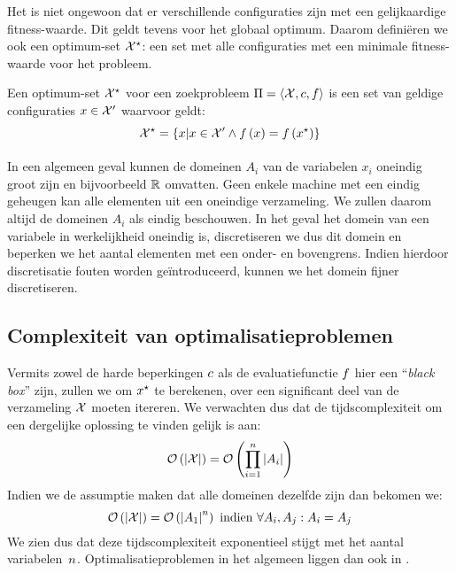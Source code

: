 Het is niet ongewoon dat er verschillende configuraties zijn met een gelijkaardige fitness-waarde. Dit geldt tevens voor het globaal optimum. Daarom defini\"eren we ook een optimum-set $\mathcal{X}^{\star}$: een set met alle configuraties met een minimale fitness-waarde voor het probleem.

\begin{definition}
Een optimum-set $\mathcal{X}^{\star}$ voor een zoekprobleem $\Pi=\left\langle \mathcal{X},c,f\right\rangle$ is een set van geldige configuraties $x\in\mathcal{X}'$ waarvoor geldt:
\begin{equation}
\mathcal{X}^{\star}=\left\{ x|x\in\mathcal{X}'\wedge f\left(x\right)=f\left(x^{\star}\right)\right\}
\end{equation}
\end{definition}

\paragraph{}
In een algemeen geval kunnen de domeinen $A_i$ van de variabelen $x_i$ oneindig groot zijn en bijvoorbeeld $\mathbb{R}$ omvatten. Geen enkele machine met een eindig geheugen kan alle elementen uit een oneindige verzameling. We zullen daarom altijd de domeinen $A_i$ als eindig beschouwen. In het geval het domein van een variabele in werkelijkheid oneindig is, discretiseren we dus dit domein en beperken we het aantal elementen met een onder- en bovengrens. Indien hierdoor discretisatie fouten worden ge\"introduceerd, kunnen we het domein fijner discretiseren.

\subsection{Complexiteit van optimalisatieproblemen}

Vermits zowel de harde beperkingen $c$ als de evaluatiefunctie $f$ hier een ``\emph{black box}'' zijn, zullen we om $x^{\star}$ te berekenen, over een significant deel van de verzameling $\mathcal{X}$ moeten itereren. We verwachten dus dat de tijdscomplexiteit om een dergelijke oplossing te vinden gelijk is aan:
\begin{equation}
\mathcal{O}\left(\left| \mathcal{X}\right|\right)=\mathcal{O}\left(\displaystyle\prod_{i=1}^n\left| A_i\right|\right)
\end{equation}
Indien we de assumptie maken dat alle domeinen dezelfde zijn dan bekomen we:
\begin{equation}
\mathcal{O}\left(\left| \mathcal{X}\right|\right)=\mathcal{O}\left(\left| A_1\right|^n\right)\mbox{ indien }\forall A_i,A_j: A_i=A_j
\end{equation}
We zien dus dat deze tijdscomplexiteit exponentieel stijgt met het aantal variabelen~$n$. Optimalisatieproblemen in het algemeen liggen dan ook in .

